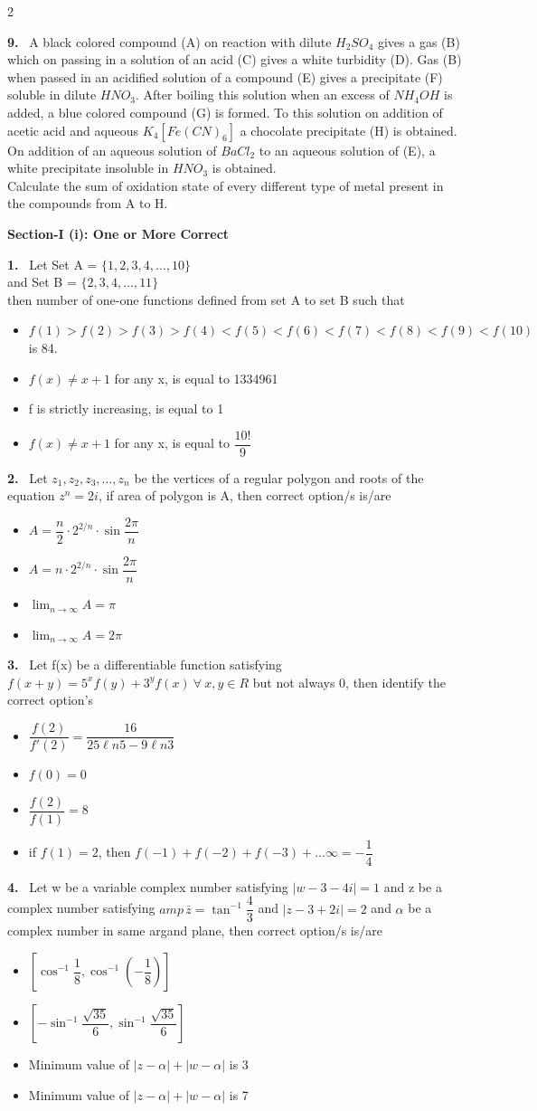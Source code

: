 \documentclass[10pt]{extarticle}
\newcommand{\partsec}[2]{\par\medskip\noindent{\large\bfseries PART-#1: #2}\par\smallskip}
\newcommand{\sect}[1]{\par\smallskip\noindent\textbf{#1}\par}
\newcommand{\qn}[1]{\par\smallskip\noindent\textbf{#1.}~}
\newenvironment{qoptions}{\begin{itemize}[leftmargin=1.8em,itemsep=1pt,topsep=2pt,label={}]}{\end{itemize}}
\newcommand{\opt}[2]{\item[(#1)] #2}
\begin{document}
\begin{multicols}{2}
\qn{9} A black colored compound (A) on reaction with dilute $H_2SO_4$ gives a gas (B) which on passing in a solution of an acid (C) gives a white turbidity (D). Gas (B) when passed in an acidified solution of a compound (E) gives a precipitate (F) soluble in dilute $HNO_3$. After boiling this solution when an excess of $NH_4OH$ is added, a blue colored compound (G) is formed. To this solution on addition of acetic acid and aqueous $K_4[Fe(CN)_6]$ a chocolate precipitate (H) is obtained. On addition of an aqueous solution of $BaCl_2$ to an aqueous solution of (E), a white precipitate insoluble in $HNO_3$ is obtained.\\
Calculate the sum of oxidation state of every different type of metal present in the compounds from A to H.

\partsec{3}{MATHEMATICS}

\sect{Section-I (i): One or More Correct}

\qn{1} Let Set A = $\{1,2,3,4,\ldots,10\}$\\
and Set B = $\{2,3,4,\ldots,11\}$\\
then number of one-one functions defined from set A to set B such that
\begin{qoptions}
\opt{A}{$f(1)>f(2)>f(3)>f(4)<f(5)<f(6)<f(7)<f(8)<f(9)<f(10)$ is 84.}
\opt{B}{$f(x)\ne x+1$ for any x, is equal to 1334961}
\opt{C}{f is strictly increasing, is equal to 1}
\opt{D}{$f(x)\ne x+1$ for any x, is equal to $\dfrac{10!}{9}$}
\end{qoptions}

\qn{2} Let $z_1,z_2,z_3,\ldots,z_n$ be the vertices of a regular polygon and roots of the equation $z^n=2i$, if area of polygon is A, then correct option/s is/are
\begin{qoptions}
\opt{A}{$A=\dfrac n2\cdot2^{2/n}\cdot\sin\dfrac{2\pi}{n}$}
\opt{B}{$A=n\cdot2^{2/n}\cdot\sin\dfrac{2\pi}{n}$}
\opt{C}{$\displaystyle\lim_{n\to\infty}A=\pi$}
\opt{D}{$\displaystyle\lim_{n\to\infty}A=2\pi$}
\end{qoptions}

\qn{3} Let f(x) be a differentiable function satisfying $f(x+y)=5^xf(y)+3^yf(x)\ \forall\ x,y\in R$ but not always 0, then identify the correct option's
\begin{qoptions}
\opt{A}{$\dfrac{f(2)}{f'(2)}=\dfrac{16}{25\ell n5-9\ell n3}$}
\opt{B}{$f(0)=0$}
\opt{C}{$\dfrac{f(2)}{f(1)}=8$}
\opt{D}{if $f(1)=2$, then $f(-1)+f(-2)+f(-3)+\ldots\infty=-\dfrac14$}
\end{qoptions}

\qn{4} Let w be a variable complex number satisfying $|w-3-4i|=1$ and z be a complex number satisfying $amp\,\bar z=\tan^{-1}\dfrac43$ and $|z-3+2i|=2$ and $\alpha$ be a complex number in same argand plane, then correct option/s is/are
\begin{qoptions}
\opt{A}{$\left[\cos^{-1}\dfrac18,\cos^{-1}\left(-\dfrac18\right)\right]$}
\opt{B}{$\left[-\sin^{-1}\dfrac{\sqrt{35}}{6},\sin^{-1}\dfrac{\sqrt{35}}{6}\right]$}
\opt{C}{Minimum value of $|z-\alpha|+|w-\alpha|$ is 3}
\opt{D}{Minimum value of $|z-\alpha|+|w-\alpha|$ is 7}
\end{qoptions}


\end{multicols}
\end{document}
